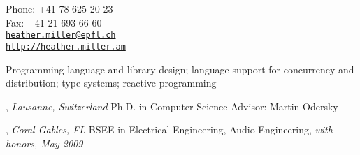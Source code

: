 \documentclass[9pt]{article}
\makeatletter
\def\myemail{heather.miller@epfl.ch}
\def\myweb{http://heather.miller.am}
\def\myfax{+41 21 693 66 60}
\def\myphone{+41 78 625 20 23}
\makeatother
\begin{document}
\begin{minipage}[t]{2.95in}

\end{minipage}
\hfill
\hfill
\begin{minipage}[t]{1.7in}
  \flushright \footnotesize Phone: \myphone \\
  Fax: \myfax  \\
  {\scriptsize  \texttt{\href{mailto:\myemail}{\myemail}}} \\
  {\scriptsize  \vspace{-0.03in} \texttt{\href{\myweb}{\myweb}}}
\end{minipage}


\medskip


\medskip


\noindent Programming language and library design; language support for concurrency and distribution; type systems; reactive programming

\medskip


, \emph{Lausanne, Switzerland} \vspace{0.01in} 
\newline Ph.D. in Computer Science
\newline Advisor: Martin Odersky 
\medskip

, \emph{Coral Gables, FL} \vspace{0.01in}  
\newline\noindent BSEE in Electrical Engineering, Audio Engineering, {\em with honors, May 2009}
\medskip
\end{document}
